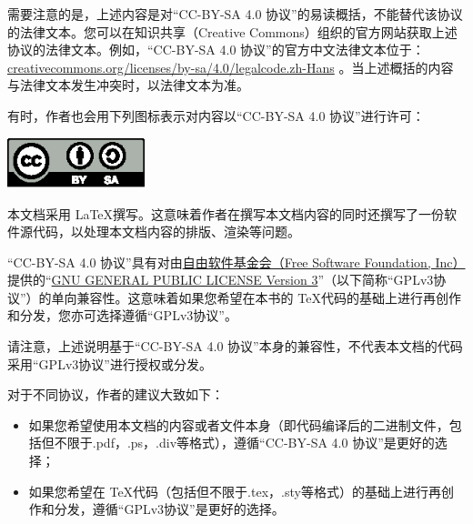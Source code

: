 需要注意的是，上述内容是对“CC-BY-SA 4.0 协议”的易读概括，不能替代该协议的法律文本。您可以在知识共享（Creative Commons）组织的官方网站获取上述协议的法律文本。例如，“CC-BY-SA 4.0 协议”的官方中文法律文本位于：\href{https://creativecommons.org/licenses/by-sa/4.0/legalcode.zh-Hans}{creativecommons.org/licenses/by-sa/4.0/legalcode.zh-Hans} 。当上述概括的内容与法律文本发生冲突时，以法律文本为准。

有时，作者也会用下列图标表示对内容以“CC-BY-SA 4.0 协议”进行许可：

\begin{center}
    \includegraphics[width = 0.3\textwidth]{pic/CC-BY-SA/BY-SA.eps}
\end{center}

本文档采用 \LaTeX 撰写。这意味着作者在撰写本文档内容的同时还撰写了一份软件源代码，以处理本文档内容的排版、渲染等问题。

“CC-BY-SA 4.0 协议”具有对由\href{https://www.fsf.org/}{自由软件基金会（Free Software Foundation, Inc）}提供的“\href{https://www.gnu.org/licenses/gpl-3.0.html}{GNU GENERAL PUBLIC LICENSE Version 3}”（以下简称“GPLv3协议”）的单向兼容性。这意味着如果您希望在本书的 \TeX 代码的基础上进行再创作和分发，您亦可选择遵循“GPLv3协议”。 


请注意，上述说明基于“CC-BY-SA 4.0 协议”本身的兼容性，不代表本文档的代码采用“GPLv3协议”进行授权或分发。

对于不同协议，作者的建议大致如下：

\begin{itemize}
    \item 如果您希望使用本文档的内容或者文件本身（即代码编译后的二进制文件，包括但不限于.pdf，.ps，.div等格式），遵循“CC-BY-SA 4.0 协议”是更好的选择；
    
    \item 如果您希望在 \TeX 代码（包括但不限于.tex，.sty等格式）的基础上进行再创作和分发，遵循“GPLv3协议”是更好的选择。
\end{itemize}

